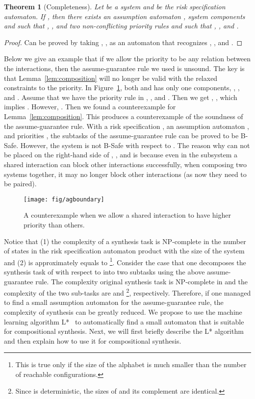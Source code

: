 \documentclass[10pt, a4paper, onecolumn, conference, compsocconf]{IEEEtran}
\newtheorem{theo}{Theorem}
\begin{document}
\begin{theo}[Completeness]\label{the:ag-complete}
Let  be a system and  be the risk specification automaton. If , then there exists an assumption automaton , system components  and  such that , , and two non-conflicting priority rules  and  such that ,  , and .
\end{theo}
\begin{proof}
Can be proved by taking , ,  as an automaton that recognizes , , and .
\end{proof}

Below we give an example that if we allow the priority  to be any relation between the interactions, then the assume-guarantee rule we used is unsound. The key is that Lemma~\ref{lem:composition} will no longer be valid with the relaxed constraints to the priority.
In Figure~\ref{fig:agboundary}, both  and  has only one components, , , and .
Assume that we have the priority rule  in , , and .
Then we get , , which implies . However, . Then we found a counterexample for Lemma~\ref{lem:composition}. This produces a counterexample of the soundness of the assume-guarantee rule.
With a risk specification , an assumption automaton , and priorities ,
the subtasks of the assume-guarantee rule can be proved to be B-Safe. However, the system  is not B-Safe with respect to . The reason why  can not be placed on the right-hand side of , , and  is because even in the subsystem a shared interaction can block other interactions successfully, when composing two systems together, it may no longer block other interactions (as now they need to be paired).

\begin{figure}
\centering
 \texttt{[image: fig/agboundary]}
  \caption{A counterexample when we allow a shared interaction to have higher priority than others.}
 \label{fig:agboundary}
\end{figure}

Notice that (1) the complexity of a synthesis task is NP-complete in the number of states in the risk specification automaton product with the size of the system and (2)  is approximately equals to \footnote{This is true only if the size of the alphabet is much smaller than the number of reachable configurations.}.
Consider the case that one decomposes the synthesis task of  with respect to  into two subtasks using the above assume-guarantee rule. The complexity original synthesis task is NP-complete in  and the complexity of the two sub-tasks are  and \footnote{Since  is deterministic, the sizes of  and its complement  are identical.}, respectively.
Therefore, if one managed to find a small assumption automaton  for the assume-guarantee rule, the complexity of synthesis can be greatly reduced. We propose to use the machine learning algorithm L*~\cite{angluin1987learning} to automatically find a small automaton that is suitable for compositional synthesis. Next, we will first briefly describe the L* algorithm and then explain how to use it for compositional synthesis.
\end{document}
